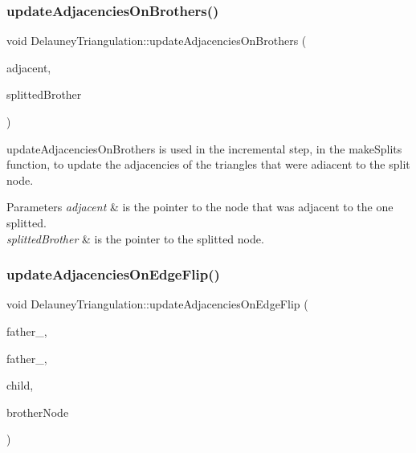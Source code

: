 \subsubsection{\texorpdfstring{update\+Adjacencies\+On\+Brothers()}{updateAdjacenciesOnBrothers()}}
{\footnotesize\ttfamily void Delauney\+Triangulation\+::update\+Adjacencies\+On\+Brothers (\begin{DoxyParamCaption}\item[{\hyperlink{classDagNode}{Dag\+Node} $\ast$}]{adjacent,  }\item[{\hyperlink{classDagNode}{Dag\+Node} $\ast$}]{splitted\+Brother }\end{DoxyParamCaption})}



update\+Adjacencies\+On\+Brothers is used in the incremental step, in the make\+Splits function, to update the adjacencies of the triangles that were adiacent to the split node. 


\begin{DoxyParams}{Parameters}
{\em adjacent} & is the pointer to the node that was adjacent to the one splitted. \\
\hline
{\em splitted\+Brother} & is the pointer to the splitted node. \\
\hline
\end{DoxyParams}
\mbox{\label{classDelauneyTriangulation_a249847fa5ada852c28381384474a397c}} 
\subsubsection{\texorpdfstring{update\+Adjacencies\+On\+Edge\+Flip()}{updateAdjacenciesOnEdgeFlip()}}
{\footnotesize\ttfamily void Delauney\+Triangulation\+::update\+Adjacencies\+On\+Edge\+Flip (\begin{DoxyParamCaption}\item[{\hyperlink{classDagNode}{Dag\+Node} $\ast$}]{father\+\_,  }\item[{\hyperlink{classDagNode}{Dag\+Node} $\ast$}]{father\+\_,  }\item[{\hyperlink{classDagNode}{Dag\+Node} $\ast$}]{child,  }\item[{\hyperlink{classDagNode}{Dag\+Node} $\ast$}]{brother\+Node }\end{DoxyParamCaption})}



